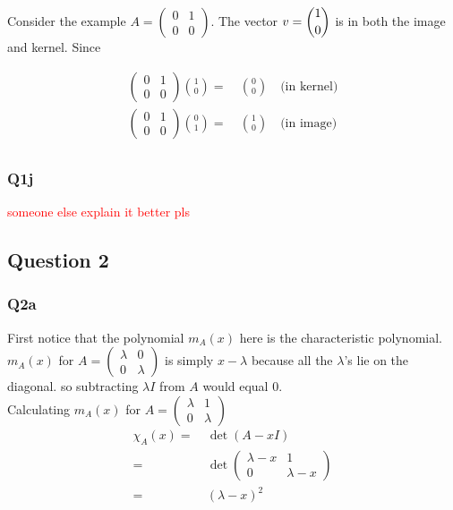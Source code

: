 Consider the example $A=\begin{pmatrix}
	0&1\\
	0&0
\end{pmatrix}$. The vector $v=\dbinom{1}{0}$ is in both the image and kernel. Since

\begin{align*}
\begin{pmatrix}
	0&1\\
	0&0
\end{pmatrix}\binom{1}{0}=&\ \binom{0}{0} \quad\text{(in kernel)}\\
\begin{pmatrix}
	0&1\\
	0&0
\end{pmatrix}\binom{0}{1}=&\ \binom{1}{0}\quad\text{(in image)}\\
\end{align*}

\subsubsection{Q1j}
\textcolor{red}{someone else explain it better pls}


\subsection{Question 2}
\subsubsection{Q2a}
First notice that the polynomial $m_A(x)$ here is the characteristic polynomial.\\  $m_A(x)$ for $A=\begin{pmatrix}
	\lambda&0\\ 0& \lambda\end{pmatrix}$ is simply $x-\lambda$ because all the $\lambda$'s lie on the diagonal. so subtracting $\lambda I$ from $A$ would equal 0.\\ 	
Calculating $m_A(x)$ for $A=\begin{pmatrix}
	\lambda&1\\ 0& \lambda\end{pmatrix}$
\begin{align*}
\chi_A(x)=&\ \det(A-xI)\\
=&\ \det \begin{pmatrix}
	\lambda-x&1\\ 0& \lambda-x\end{pmatrix}\\
	=&\ (\lambda-x)^2
\end{align*}


